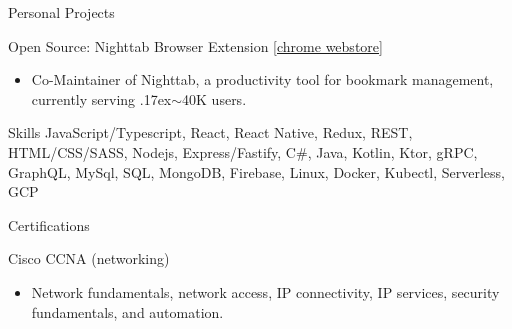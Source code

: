 \documentclass{article}
\newlength{\tabin}
\newlength{\secsep}
\newcommand{\lineunder}{\vspace*{-8pt} \\ \hspace*{-6pt} \hrulefill \\ \vspace*{-15pt}}
\newenvironment{tabbedsection}[1]{
  \begin{list}{}{
      \setlength{\itemsep}{0pt}
      \setlength{\labelsep}{0pt}
      \setlength{\labelwidth}{0pt}
      \setlength{\leftmargin}{\tabin}
      \setlength{\rightmargin}{\tabin}
      \setlength{\listparindent}{0pt}
      \setlength{\parsep}{0pt}
      \setlength{\parskip}{0pt}
      \setlength{\partopsep}{0pt}
      \setlength{\topsep}{#1}
    }
  \item[]
}{\end{list}}
\newenvironment{resume_section}[1]{
  \filbreak
  \vspace{2\secsep}
  \textsc{\large#1}
  \lineunder
  \begin{tabbedsection}{\secsep}
}{\end{tabbedsection}}
\newenvironment{resume_subsection}[2][]{
  \textbf{#2} \hfill {\footnotesize #1} \hspace{2em}
  \begin{tabbedsection}{0.5\secsep}
}{\end{tabbedsection}}
\newenvironment{subitems}{
  \renewcommand{\labelitemi}{-}
  \begin{itemize}
      \setlength{\labelsep}{1em}
}{\end{itemize}}
\begin{document}
  \begin{resume_section}{Personal Projects}
      \begin{resume_subsection}{Open Source: Nighttab Browser Extension [{\href{https://chrome.google.com/webstore/detail/nighttab/hdpcadigjkbcpnlcpbcohpafiaefanki}{chrome webstore}]}}
      \begin{subitems}
      \item Co-Maintainer of Nighttab, a productivity tool for bookmark management, currently serving {\raise.17ex\hbox{$\scriptstyle\sim$}}40K users.
      \end{subitems}
    \end{resume_subsection}
  \end{resume_section}

  \begin{resume_section}{Skills}
    JavaScript/Typescript,
    React,
    React
    Native,
    Redux,
    REST,
    HTML/CSS/SASS,
    Nodejs,
    Express/Fastify,
    C\#,
    Java,
    Kotlin,
    Ktor,
    gRPC,
    GraphQL,
    MySql,
    SQL,
    MongoDB,
    Firebase,
    Linux,
    Docker,
    Kubectl,
    Serverless,
    GCP
  \end{resume_section}

  \begin{resume_section}{Certifications}
    \begin{resume_subsection}[]{Cisco CCNA (networking)}
      \begin{subitems}
        \item Network fundamentals, network access, IP connectivity, IP services, security fundamentals, and automation.
      \end{subitems}
    \end{resume_subsection}
  \end{resume_section}
\end{document}
